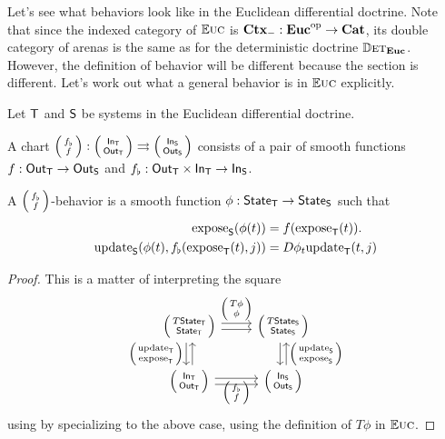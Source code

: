 \documentclass[DynamicalBook]{subfiles}
\begin{document}
Let's see what behaviors look like in the Euclidean differential doctrine. Note
that since the indexed category of $\mathbb{E}\textsc{uc}$ is $\textbf{Ctx}_{-} : \textbf{Euc}^{\textnormal{op}} \to
\textbf{Cat}$, its double category of arenas is the same as for the deterministic
doctrine $\mathbb{D}\textsc{et}_{\textbf{Euc}}$. However, the definition of behavior will be
different because the section is different. Let's work out what a general
behavior is in $\mathbb{E}\textsc{uc}$ explicitly.
\begin{proposition}
Let $\mathsf{T}$ and $\mathsf{S}$ be systems in the Euclidean differential doctrine. 

A
chart $\lens{f_{\flat}}{f} : \lens{\In{T}}{\Out{T}} \rightrightarrows
\lens{\In{S}}{\Out{S}}$ consists of a pair of smooth functions $f : \mathsf{Out}_{\mathsf{T}} \to \mathsf{Out}_{\mathsf{S}}$ and
$f_{\flat} : \mathsf{Out}_{\mathsf{T}} \times \mathsf{In}_{\mathsf{T}} \to \mathsf{In}_{\mathsf{S}}$. 

A $\lens{f_{\flat}}{f}$-behavior is a smooth function $\phi : \mathsf{State}_{\mathsf{T}} \to
\mathsf{State}_{\mathsf{S}}$ such that 
\begin{align*}
  \mathrm{expose}_{\mathsf{S}}(\phi(t)) &= f(\mathrm{expose}_{\mathsf{T}}(t)).\\
  \mathrm{update}_{\mathsf{S}}(\phi(t), f_{\flat}(\mathrm{expose}_{\mathsf{T}}(t), j)) &= D\phi_{t} \mathrm{update}_{\mathsf{T}}(t, j) \\
\end{align*}
\end{proposition}
\begin{proof}
  This is a matter of interpreting the square
\[
    \begin{tikzcd}
      \lens{T\State{T}}{\State{T}} \ar[r, shift left, "\lens{T\phi}{\phi}"] \ar[r, shift right] \ar[d, shift right,
      "\lens{\update{T}}{\expose{T}}"'] \ar[d, shift left, leftarrow] &
      \lens{T\State{S}}{\State{S}} \ar[d, shift left, leftarrow,
      "\lens{\update{S}}{\expose{S}}"] \ar[d, shift right]\\
      \lens{\In{T}}{\Out{T}} \ar[r, shift right] \ar[r,
      shift left, "\lens{f_{\flat}}{f}"'] & \lens{\In{S}}{\Out{S}}
    \end{tikzcd}
\]
using by specializing \cite{eqn.dbl_cat_arena_square_commuting} to the above
case, using the definition of $T\phi$ in $\mathbb{E}\textsc{uc}$.  
\end{proof}
\end{document}
